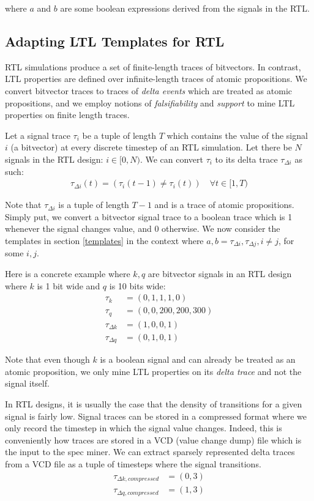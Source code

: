\documentclass[acmlarge,11pt]{acmart}
\begin{document}
where $a$ and $b$ are some boolean expressions derived from the signals in the RTL.

\subsection{Adapting LTL Templates for RTL}
RTL simulations produce a set of finite-length traces of bitvectors.
In contrast, LTL properties are defined over infinite-length traces of atomic propositions.
We convert bitvector traces to traces of \textit{delta events} which are treated as atomic propositions, and we employ notions of \textit{falsifiability} and \textit{support} to mine LTL properties on finite length traces.

Let a signal trace $\tau_i$ be a tuple of length $T$ which contains the value of the signal $i$ (a bitvector) at every discrete timestep of an RTL simulation.
Let there be $N$ signals in the RTL design: $i \in [0,N)$.
We can convert $\tau_i$ to its delta trace $\tau_{\Delta i}$ as such:
\begin{align*}
  \tau_{\Delta i}(t) = (\tau_i(t-1) \neq \tau_i(t)) \quad \forall t \in [1,T)
\end{align*}

Note that $\tau_{\Delta i}$ is a tuple of length $T-1$ and is a trace of atomic propositions.
Simply put, we convert a bitvector signal trace to a boolean trace which is 1 whenever the signal changes value, and 0 otherwise.
We now consider the templates in section \ref{templates} in the context where $a, b = \tau_{\Delta i}, \tau_{\Delta j}, i \neq j$, for some $i, j$.

Here is a concrete example where $k, q$ are bitvector signals in an RTL design where $k$ is 1 bit wide and $q$ is 10 bits wide:
\begin{align*}
  \tau_{k} &= (0, 1, 1, 1, 0) \\
  \tau_{q} &= (0, 0, 200, 200, 300) \\
  \tau_{\Delta k} &= (1, 0, 0, 1) \\
  \tau_{\Delta q} &= (0, 1, 0, 1)
\end{align*}

Note that even though $k$ is a boolean signal and can already be treated as an atomic proposition, we only mine LTL properties on its \textit{delta trace} and not the signal itself.

In RTL designs, it is usually the case that the density of transitions for a given signal is fairly low.
Signal traces can be stored in a compressed format where we only record the timestep in which the signal value changes.
Indeed, this is conveniently how traces are stored in a VCD (value change dump) file which is the input to the spec miner.
We can extract sparsely represented delta traces from a VCD file as a tuple of timesteps where the signal transitions. %
\begin{align*}
  \tau_{\Delta k, compressed} &= (0, 3) \\
  \tau_{\Delta q, compressed} &= (1, 3)
\end{align*}
\end{document}
